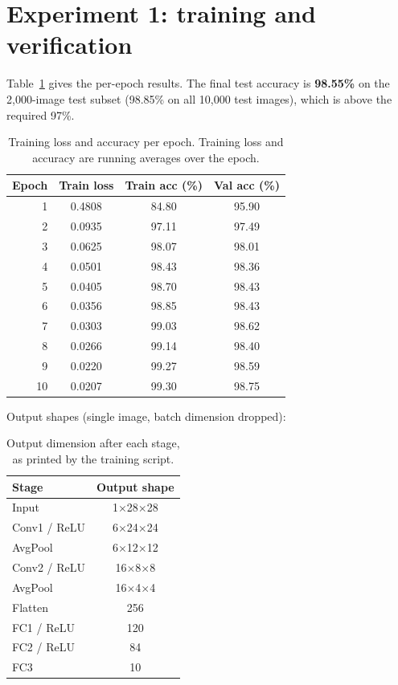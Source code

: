 \documentclass[12pt]{article}
\begin{document}

\section{Experiment 1: training and verification}

Table~\ref{tab:train} gives the per-epoch results. The final test accuracy is \textbf{98.55\%} on the 2,000-image test subset (98.85\% on all 10,000 test images), which is above the required 97\%.

\begin{table}[H]
\centering
\begin{tabular}{rccc}
\toprule
Epoch & Train loss & Train acc (\%) & Val acc (\%) \\
\midrule
1 & 0.4808 & 84.80 & 95.90 \\
2 & 0.0935 & 97.11 & 97.49 \\
3 & 0.0625 & 98.07 & 98.01 \\
4 & 0.0501 & 98.43 & 98.36 \\
5 & 0.0405 & 98.70 & 98.43 \\
6 & 0.0356 & 98.85 & 98.43 \\
7 & 0.0303 & 99.03 & 98.62 \\
8 & 0.0266 & 99.14 & 98.40 \\
9 & 0.0220 & 99.27 & 98.59 \\
10 & 0.0207 & 99.30 & 98.75 \\
\bottomrule
\end{tabular}
\caption{Training loss and accuracy per epoch. Training loss and accuracy are running averages over the epoch.}
\label{tab:train}
\end{table}

Output shapes (single image, batch dimension dropped):

\begin{table}[H]
\centering
\begin{tabular}{lc}
\toprule
Stage & Output shape \\
\midrule
Input & 1$\times$28$\times$28 \\
Conv1 / ReLU & 6$\times$24$\times$24 \\
AvgPool & 6$\times$12$\times$12 \\
Conv2 / ReLU & 16$\times$8$\times$8 \\
AvgPool & 16$\times$4$\times$4 \\
Flatten & 256 \\
FC1 / ReLU & 120 \\
FC2 / ReLU & 84 \\
FC3 & 10 \\
\bottomrule
\end{tabular}
\caption{Output dimension after each stage, as printed by the training script.}
\end{table}
\end{document}
